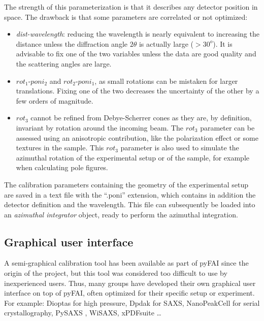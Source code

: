 \documentclass[preprint]{iucr}              %
\begin{document}
The strength of this parameterization is that it describes any detector position in
space. 
The drawback is that some parameters are correlated or not optimized:

\begin{itemize}
  \item \textit{dist-wavelength}: reducing the wavelength is nearly equivalent
  to increasing the distance unless the diffraction angle $2\theta$ is actually
  large ($>30^o$). 
  It is advisable to fix one of the two variables unless the data are good
  quality and the scattering angles are large.
  \item $rot_1$-$poni_2$ and $rot_2$-$poni_1$, as small rotations can be
  mistaken for larger translations. 
  Fixing one of the two decreases the uncertainty of the other by a few orders of
  magnitude.
  \item $rot_3$ cannot be refined from Debye-Scherrer cones as they are, by definition,
  invariant by rotation around the incoming beam. The $rot_3$ parameter can be
   assessed using an anisotropic contribution, like the polarization effect or
  some  textures in the sample.
  This $rot_3$ parameter is also used to simulate the azimuthal rotation of
  the experimental setup or of the sample, for example when calculating pole
  figures.
\end{itemize}
 

The calibration parameters containing the geometry of the experimental setup are saved in a text file with the ``.poni''
extension, which contains in addition the detector definition and the wavelength.
This file can subsequently be loaded into an \textit{azimuthal integrator}
object, ready to perform the azimuthal integration.

\subsection{Graphical user interface}

A semi-graphical calibration tool has been available as part of pyFAI
\cite{fv5028} since the origin of the project, but this tool was considered too
difficult to use by inexperienced users.
Thus, many groups have developed their own graphical user interface on top of
pyFAI, often optimized for their specific setup or experiment.
For example: Dioptas \cite{diopta_publi} for high pressure, Dpdak \cite{dpdak}
for SAXS, NanoPeakCell \cite{nanopeakcell} for serial crystallography,
PySAXS \cite{pysaxs}, WiSAXS, xPDFsuite \cite{xpdfsuite}\ldots
\end{document}
